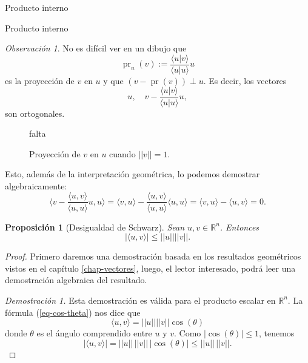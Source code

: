 \documentclass[a4paper,12pt,twoside,spanish,reqno]{amsbook}
\numberwithin{equation}{section}
\newtheorem{proposicion}[teorema]{Proposici\'on}
\theoremstyle{definition}
\theoremstyle{remark}
\newtheorem{observacion}[teorema]{Observaci\'on}
\newcommand{\la}{\langle}
\newcommand{\ra}{\rangle}
\newcommand{\R}{\mathbb R}
\begin{document}
\begin{chapter}{Producto interno}
\begin{section}{Producto interno}
        \medskip
        
        \begin{observacion}\label{obs-proyeccion-ort}
            No es difícil ver en un dibujo que 
            \begin{equation*}
                \operatorname{pr}_u(v) := \frac{\la u|v\ra}{\la u|u\ra}u
            \end{equation*}
             es la proyección de $v$ en $u$ y que   $(v - \operatorname{pr}(v)) \perp u$. Es decir,   los vectores
            \begin{equation*}
                    u, \quad   v - \frac{\la u|v\ra}{\la u|u\ra}u,
            \end{equation*}
            son ortogonales.
            \begin{figure}[h]
                falta
                \caption{Proyección de $v$ en $u$ cuando $||v||=1$.}\label{fig-proyeccion-ort}
            \end{figure}
        
        
            Esto,  además de la interpretación geométrica, lo podemos demostrar algebraicamente:
            \begin{equation*}
            \la v - \frac{\la u,v\ra}{\la u,u\ra} u , u \ra =
            \la v , u \ra  -\frac{\la u,v\ra}{\la u,u\ra}\la u , u \ra =  \la v , u \ra -  \la u , v \ra =0.
            \end{equation*}
            
        \end{observacion}
        
        \begin{proposicion}[Desigualdad de Schwarz] Sean $u, v\in \R^n$. Entonces 
            $$|\la u, v \ra| \le ||u||||v||.$$
        \end{proposicion}
        \begin{proof} Primero daremos una demostración basada en los resultados geométricos vistos en el capítulo \ref{chap-vectores}, luego,  el lector interesado, podrá leer una demostración algebraica del resultado. 
        
        \textit{Demostración 1.} Esta demostración es válida para el producto escalar en $\R^n$. La fórmula (\ref{eq-cos-theta}) nos dice que 
        \begin{equation*}
            \la u, v \ra = ||u||||v||\cos(\theta)
        \end{equation*}
        donde $\theta$ es el ángulo comprendido entre $u$ y $v$. Como $|\cos(\theta)| \le 1$,  tenemos
        \begin{equation*}
            |\la u, v \ra| = ||u||\,||v||\,|\cos(\theta)| \le  ||u||\,||v||.
        \end{equation*}
        

\end{proof}
\end{section}
\end{chapter}
\end{document}
